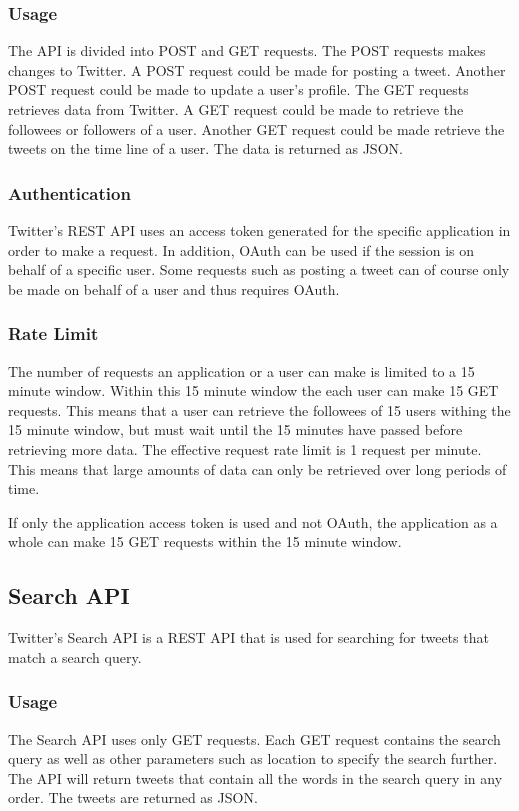 \subsubsection{Usage}
The API is divided into POST and GET requests. The POST requests makes changes to Twitter. A POST request could be made for posting a tweet. Another POST request could be made to update a user's profile. The GET requests retrieves data from Twitter. A GET request could be made to retrieve the followees or followers of a user. Another GET request could be made retrieve the tweets on the time line of a user. The data is returned as JSON. \cite{twitter-rest-api}

\subsubsection{Authentication}
Twitter's REST API uses an access token generated for the specific application in order to make a request. In addition, OAuth can be used if the session is on behalf of a specific user. Some requests such as posting a tweet can of course only be made on behalf of a user and thus requires OAuth. \cite{twitter-rest-api}

\subsubsection{Rate Limit}
The number of requests an application or a user can make is limited to a 15 minute window. Within this 15 minute window the each user can make 15 GET requests. This means that a user can retrieve the followees of 15 users withing the 15 minute window, but must wait until the 15 minutes have passed before retrieving more data. The effective request rate limit is 1 request per minute. This means that large amounts of data can only be retrieved over long periods of time.

If only the application access token is used and not OAuth, the application as a whole can make 15 GET requests within the 15 minute window. \cite{twitter-rate-limiting}

\subsection{Search API}\label{sec:pre-twitter-search}
Twitter's Search API is a REST API that is used for searching for tweets that match a search query.

\subsubsection{Usage}
The Search API uses only GET requests. Each GET request contains the search query as well as other parameters such as location to specify the search further. The API will return tweets that contain all the words in the search query in any order. The tweets are returned as JSON.\cite{twitter-rest-api}

